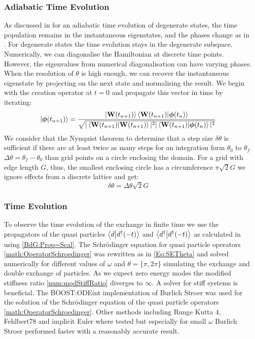 \documentclass[Master]{subfiles}
\begin{document}
\subsubsection{Adiabatic Time Evolution}
As discussed in  for an adiabatic time evolution of degenerate states, the time population remains in the instantaneous eigenstates, and the phases change as in . For degenerate states the time evolution stays in the degenerate subspace. Numerically, we can diagonalise the Hamiltonian at discrete time points. However, the eigenvalues from numerical diagonalisation can have varying phases. 
When the resolution of $\theta$ is high enough, we can recover the instantaneous eigenstate by projecting on the next state  and normalising the result. We begin with the creation operator at $t=0$ and propagate this vector in time by iterating:
$$\ket{\boldsymbol{{\phi}}(t_{n+1})} =  \frac{\ket{\mathbf{W}(t_{n+1})}\bra{\mathbf{W}(t_{n+1})}\ket{\boldsymbol{\phi}(t_{n})}}
{\sqrt{|\braket{\mathbf{W}(t_{n+1})}|^2 |\braket{\mathbf{W}(t_{n+1})}{\boldsymbol{\phi}(t_{n})}|^2}}$$
We consider that the Nynquist theorem \cite{shannon1949communication} to determine that a step size $\delta \theta$ is sufficient if there are at least twice as many steps for an integration form $\theta_0$ to $\theta_f$  $\Delta\theta = \theta_f-\theta_0$ than grid points on a circle enclosing the domain. For a grid with edge length $G$, thus, the smallest enclosing circle has a circumference $\pi \sqrt{2} G$ we ignore effects from a discrete lattice and get:
$$\delta\theta = \Delta\theta \sqrt{2} G$$
\mypagebreak
\subsubsection{Time Evolution}
To observe the time evolution of the exchange in finite time we use the propagators of the quasi particles $\braket{d}{d^{\dag}(-t)}$ and $\braket{d^{\dag}}{d^{\dag}(-t)}$ 
as calculated in  using \eqref{BdG:Prop=Scal}. The Schrödinger equation for quasi particle operators \eqref{math:OperatorSchroedinger} was rewritten as in \eqref{Eq:SETheta} and solved numerically for different values of $\omega$ and $\theta = \{\pi, 2 \pi\}$ simulating the exchange and double exchange of particles. As we expect zero energy modes the modified stiffness ratio \ref{num:modStiffRatio} diverges  to $\infty$. A solver for stiff systems is beneficial.
The BOOST:ODEint \cite{ahnert2011odeint} implementation of Burlich Stroer  was used for the solution of the Schrödinger equation of the quasi particle operators \ref{math:OperatorSchroedinger}. Other methods including Runge Kutta 4, Fehlbert78  and implicit Euler where tested but especially for small $\omega$ Burlich Stroer performed faster with a reasonably accurate result. 
\end{document}
